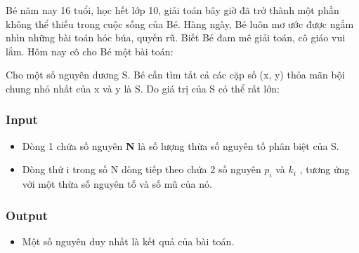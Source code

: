 



   Bé năm nay 16 tuổi, học hết lớp 10, giải toán bây giờ đã trở thành một phần không thể thiếu trong cuộc sống của Bé. Hàng ngày, Bé luôn mơ ước được ngắm nhìn  những bài toán hóc búa, quyến rũ. Biết Bé đam mê giải toán, cô giáo vui  lắm. Hôm nay cô cho Bé một bài toán:  

   Cho một số nguyên dương S. Bé cần tìm tất cả các cặp số (x, y) thỏa mãn bội chung nhỏ nhất của x và y là S. Do giá trị của S có thể rất lớn:  

\subsubsection{   Input  }
\begin{itemize}
	\item     Dòng 1 chứa số nguyên    \textbf{     N    }    là số lượng thừa số nguyên tố phân biệt của S.   
	\item     Dòng thứ i trong số N dòng tiếp theo chứa 2 số nguyên    \textbf{     $p_{i}$}    và    \textbf{     $k_{i}$}    , tương ứng với một thừa số nguyên tố và số mũ của nó.   
\end{itemize}

\subsubsection{   Output  }
\begin{itemize}
	\item     Một số nguyên duy nhất là kết quả của bài toán.   
\end{itemize}

